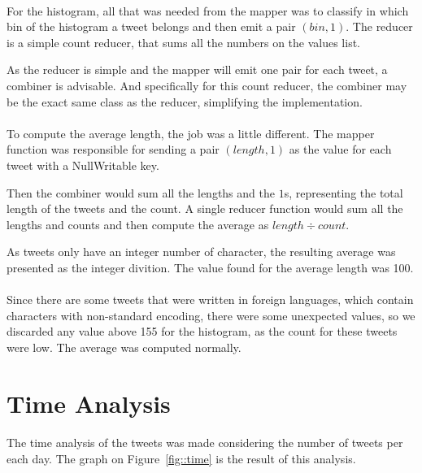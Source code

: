 \documentclass[10pt,a4paper]{article}
\begin{document}

\paragraph*{}
For the histogram, all that was needed from the mapper was to classify in which
bin of the histogram a tweet belongs and then emit a pair $(bin, 1)$. The
reducer is a simple count reducer, that sums all the numbers on the values list.

As the reducer is simple and the mapper will emit one pair for each tweet, a
combiner is advisable. And specifically for this count reducer, the combiner may
be the exact same class as the reducer, simplifying the implementation.

\paragraph*{}
To compute the average length, the job was a little different. The mapper
function was responsible for sending a pair $(length, 1)$ as the value for each
tweet with a NullWritable key.

Then the combiner would sum all the lengths and the $1$s, representing the total
length of the tweets and the count.  A single reducer function would sum all the
lengths and counts and then compute the average as $length \div count$.

As tweets only have an integer number of character, the resulting average was
presented as the integer divition. The value found for the average length was
100.

\paragraph*{}
Since there are some tweets that were written in foreign languages, which
contain characters with non-standard encoding, there were some unexpected
values, so we discarded any value above 155 for the histogram, as the count for
these tweets were low. The average was computed normally.


\section{Time Analysis}

\paragraph*{}
The time analysis of the tweets was made considering the number of tweets per
each day. The graph on Figure~\ref{fig::time} is the result of this analysis.
\end{document}
